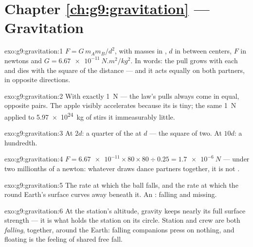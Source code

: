 \section*{Chapter \ref{ch:g9:gravitation} --- Gravitation}

\begin{solution}{exo:g9:gravitation:1}
$F = G \, m_A m_B / d^2$, with masses in , $d$ in
 between centers, $F$ in newtons and
$G = \qty{6.67e-11}{N.m^2/kg^2}$. In words: the pull grows
with each  and dies with the square of the distance ---
and it acts equally on both partners, in opposite directions.
\end{solution}

\begin{solution}{exo:g9:gravitation:2}
With exactly \qty{1}{N} --- the law's pulls always come in
equal, opposite pairs. The apple visibly accelerates because
its  is tiny; the same \qty{1}{N} applied to
\qty{5.97e24}{kg} of  stirs it immeasurably little.
\end{solution}

\begin{solution}{exo:g9:gravitation:3}
At $2d$: a quarter of the  at $d$ --- the square of two.
At $10d$: a hundredth.
\end{solution}

\begin{solution}{exo:g9:gravitation:4}
$F = \num{6.67e-11} \times 80 \times 80 \div 0.25 =
\qty{1.7e-6}{N}$ --- under two millionths of a newton:
whatever draws dance partners together, it is not
.
\end{solution}

\begin{solution}{exo:g9:gravitation:5}
The rate at which the ball falls, and the rate at which the
round Earth's surface curves away beneath it. An :
falling and missing.
\end{solution}

\begin{solution}{exo:g9:gravitation:6}
At the station's altitude, gravity keeps nearly its full
surface strength --- it is what holds the station on its
circle. Station and crew are both \emph{falling}, together,
around the Earth: falling companions press on nothing, and
floating is the feeling of shared free fall.
\end{solution}

